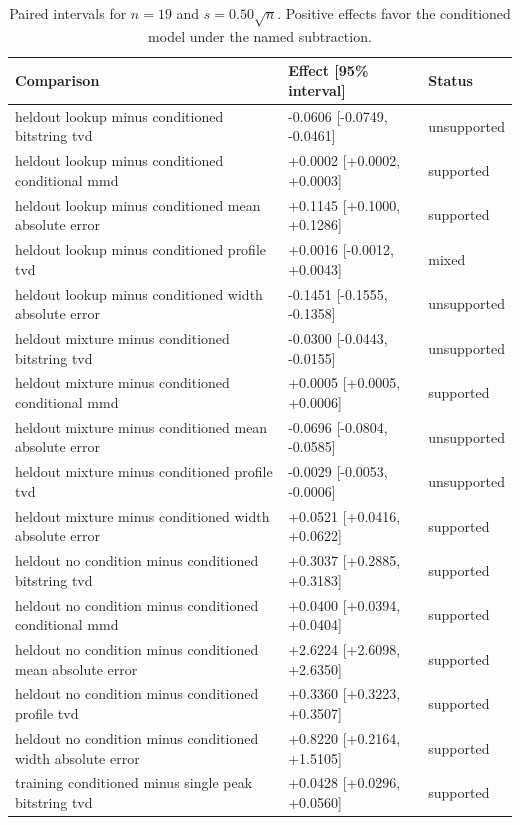 \begin{table}[p]
\centering
\scriptsize
\setlength{\tabcolsep}{4pt}
\caption{Paired intervals for $n=19$ and $s=0.50\sqrt n$. Positive effects favor the conditioned model under the named subtraction.}
\label{tab:all-intervals-n19-w0.50}
\begin{tabular}{@{}p{}p{}p{}@{}}
\toprule
Comparison & Effect [95\% interval] & Status\\
\midrule
heldout lookup minus conditioned bitstring tvd & -0.0606 [-0.0749, -0.0461] & unsupported \\
heldout lookup minus conditioned conditional mmd & +0.0002 [+0.0002, +0.0003] & supported \\
heldout lookup minus conditioned mean absolute error & +0.1145 [+0.1000, +0.1286] & supported \\
heldout lookup minus conditioned profile tvd & +0.0016 [-0.0012, +0.0043] & mixed \\
heldout lookup minus conditioned width absolute error & -0.1451 [-0.1555, -0.1358] & unsupported \\
heldout mixture minus conditioned bitstring tvd & -0.0300 [-0.0443, -0.0155] & unsupported \\
heldout mixture minus conditioned conditional mmd & +0.0005 [+0.0005, +0.0006] & supported \\
heldout mixture minus conditioned mean absolute error & -0.0696 [-0.0804, -0.0585] & unsupported \\
heldout mixture minus conditioned profile tvd & -0.0029 [-0.0053, -0.0006] & unsupported \\
heldout mixture minus conditioned width absolute error & +0.0521 [+0.0416, +0.0622] & supported \\
heldout no condition minus conditioned bitstring tvd & +0.3037 [+0.2885, +0.3183] & supported \\
heldout no condition minus conditioned conditional mmd & +0.0400 [+0.0394, +0.0404] & supported \\
heldout no condition minus conditioned mean absolute error & +2.6224 [+2.6098, +2.6350] & supported \\
heldout no condition minus conditioned profile tvd & +0.3360 [+0.3223, +0.3507] & supported \\
heldout no condition minus conditioned width absolute error & +0.8220 [+0.2164, +1.5105] & supported \\
training conditioned minus single peak bitstring tvd & +0.0428 [+0.0296, +0.0560] & supported \\

\end{tabular}
\end{table}
